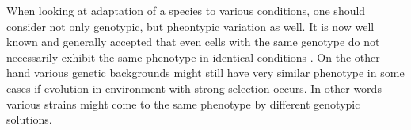 When looking at adaptation of a species to various conditions, one should consider not only genotypic, but pheontypic variation as well.
It is now well known and generally accepted that even cells with the same genotype do not necessarily exhibit the same phenotype in identical conditions \cite{ronin2017long, govers2018protein}.
On the other hand various genetic backgrounds might still have very similar phenotype in some cases if evolution in environment with strong selection occurs.
In other words various strains might come to the same phenotype by different genotypic solutions.

\cleardoublepage

